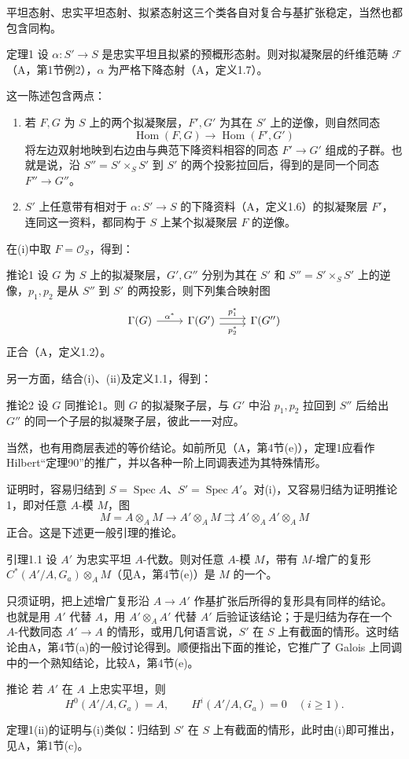 平坦态射、忠实平坦态射、拟紧态射这三个类各自对复合与基扩张稳定，当然也都包含同构。
\begin{statement}{定理1}
设 $\alpha:S'\to S$ 是忠实平坦且拟紧的预概形态射。则对拟凝聚层的纤维范畴 $\mathcal F$（A，第1节例2），$\alpha$ 为严格下降态射（A，定义1.7）。
\end{statement}
这一陈述包含两点：
\begin{enumerate}[label=(\roman*)]
\item 若 $F,G$ 为 $S$ 上的两个拟凝聚层，$F',G'$ 为其在 $S'$ 上的逆像，则自然同态
\[
\operatorname{Hom}(F,G)\longrightarrow\operatorname{Hom}(F',G')
\]
将左边双射地映到右边由与典范下降资料相容的同态 $F'\to G'$ 组成的子群。也就是说，沿 $S''=S'\times_SS'$ 到 $S'$ 的两个投影拉回后，得到的是同一个同态 $F''\to G''$。
\item $S'$ 上任意带有相对于 $\alpha:S'\to S$ 的下降资料（A，定义1.6）的拟凝聚层 $F'$，连同这一资料，都同构于 $S$ 上某个拟凝聚层 $F$ 的逆像。
\end{enumerate}
在(i)中取 $F=\mathcal O_S$，得到：
\begin{statement}{推论1}
设 $G$ 为 $S$ 上的拟凝聚层，$G',G''$ 分别为其在 $S'$ 和 $S''=S'\times_SS'$ 上的逆像，$p_1,p_2$ 是从 $S''$ 到 $S'$ 的两投影，则下列集合映射图
\[
\begin{tikzcd}
\Gamma(G)\arrow[r,"\alpha^*"]&\Gamma(G')\arrow[r,shift left=.6ex,"p_1^*"]\arrow[r,shift right=.6ex,"p_2^*"']&\Gamma(G'')
\end{tikzcd}
\]
正合（A，定义1.2）。
\end{statement}
另一方面，结合(i)、(ii)及定义1.1，得到：
\begin{statement}{推论2}
设 $G$ 同推论1。则 $G$ 的拟凝聚子层，与 $G'$ 中沿 $p_1,p_2$ 拉回到 $S''$ 后给出 $G''$ 的同一个子层的拟凝聚子层，彼此一一对应。
\end{statement}
当然，也有用商层表述的等价结论。如前所见（A，第4节(e)），定理1应看作 Hilbert“定理90”的推广，并以各种一阶上同调表述为其特殊情形。

证明时，容易归结到 $S=\operatorname{Spec}A$、$S'=\operatorname{Spec}A'$。对(i)，又容易归结为证明推论1，即对任意 $A$-模 $M$，图
\[
M=A\otimes_AM\longrightarrow A'\otimes_AM
\rightrightarrows A'\otimes_AA'\otimes_AM
\]
正合。这是下述更一般引理的推论。
\begin{statement}{引理1.1}
设 $A'$ 为忠实平坦 $A$-代数。则对任意 $A$-模 $M$，带有 $M$-增广的复形 $C^*(A'/A,G_a)\otimes_AM$（见A，第4节(e)）是 $M$ 的一个。
\end{statement}
只须证明，把上述增广复形沿 $A\to A'$ 作基扩张后所得的复形具有同样的结论。也就是用 $A'$ 代替 $A$，用 $A'\otimes_AA'$ 代替 $A'$ 后验证该结论；于是归结为存在一个 $A$-代数同态 $A'\to A$ 的情形，或用几何语言说，$S'$ 在 $S$ 上有截面的情形。这时结论由A，第4节(a)的一般讨论得到。顺便指出下面的推论，它推广了 Galois 上同调中的一个熟知结论，比较A，第4节(e)。
\begin{statement}{推论}
若 $A'$ 在 $A$ 上忠实平坦，则
\[
H^0(A'/A,G_a)=A,\qquad H^i(A'/A,G_a)=0\quad(i\ge1).
\]
\end{statement}
定理1(ii)的证明与(i)类似：归结到 $S'$ 在 $S$ 上有截面的情形，此时由(i)即可推出，见A，第1节(c)。

